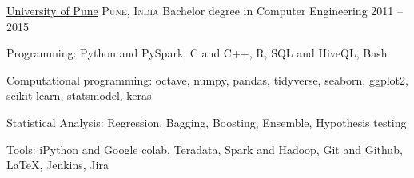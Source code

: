 \documentclass[10pt,a4paper]{article}
\begin{document}
\spacedhrule{0.9em}{-0.4em}




\headedsection
  {\href{}{University of Pune}}
  {\textsc{Pune, India}} {%
  \headedsubsection
    {Bachelor degree in Computer Engineering}
    {2011 -- 2015}
    {}
}

\spacedhrule{0.9em}{-0.4em}



\inlineheadsection  %
 {Programming:}
{Python and PySpark, C and C++, R, SQL and HiveQL, Bash}
\vspace{0.5em}

\inlineheadsection
 {Computational programming:}
{octave, numpy, pandas, tidyverse, seaborn, ggplot2, scikit-learn, statsmodel, keras}
\vspace{0.5em}

\inlineheadsection
 {Statistical Analysis:}
{Regression, Bagging, Boosting, Ensemble, Hypothesis testing}
\vspace{0.5em}

\inlineheadsection
  {Tools:}
  {iPython and Google colab, Teradata, Spark and Hadoop, Git and Github, \LaTeX, Jenkins, Jira}
\end{document}
